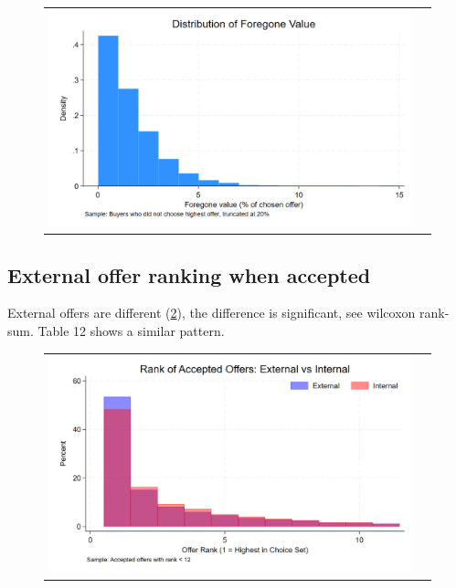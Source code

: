 \documentclass[12pt]{article}
\begin{document}
  \begin{figure}[H]
\caption{}
 \label{fig:ie4_11}
\centering{}%
\begin{tabular}{cc}
\includegraphics[scale=0.27]{figures/IE4/IE4_foregone_distribution.png} 
\end{tabular}
\end{figure} 





\newpage

\subsection{External offer ranking when accepted}

External offers are different (\ref{fig:ie4_11}), the difference is significant, see wilcoxon rank-sum. Table 12 shows a similar pattern. 
\begin{figure}[H]
\caption{}
\label{fig:ie4_11}
\centering{}%
\begin{tabular}{cc}
\includegraphics[scale=0.27]{figures/IE4/IE4_rank_of_accepted_external.png} 
\end{tabular}
\end{figure} 
\end{document}
